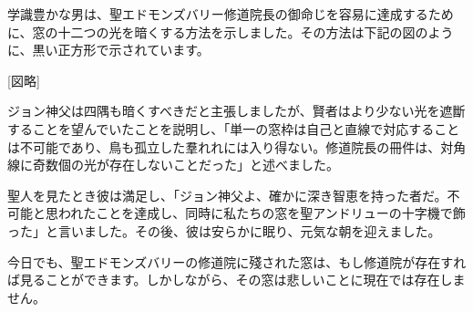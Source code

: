 \documentclass[10pt,a4paper,oneside,openany]{ltjsbook}
\begin{document}
\begin{tcolorbox}[colback=softblue,colframe=primaryblue,title=\textbf{第 292 問：THE ABBOT'S WINDOW.},arc=2mm,boxrule=1pt,breakable]
学識豊かな男は、聖エドモンズバリー修道院長の御命じを容易に達成するために、窓の十二つの光を暗くする方法を示しました。その方法は下記の図のように、黒い正方形で示されています。

[図略]

ジョン神父は四隅も暗くすべきだと主張しましたが、賢者はより少ない光を遮斷することを望んでいたことを説明し、「単一の窓枠は自己と直線で対応することは不可能であり、鳥も孤立した羣れれには入り得ない。修道院長の冊件は、対角線に奇数個の光が存在しないことだった」と述べました。

聖人を見たとき彼は満足し、「ジョン神父よ、確かに深き智恵を持った者だ。不可能と思われたことを達成し、同時に私たちの窓を聖アンドリューの十字機で飾った」と言いました。その後、彼は安らかに眠り、元気な朝を迎えました。

今日でも、聖エドモンズバリーの修道院に殘された窓は、もし修道院が存在すれば見ることができます。しかしながら、その窓は悲しいことに現在では存在しません。
\end{tcolorbox}
\end{document}
